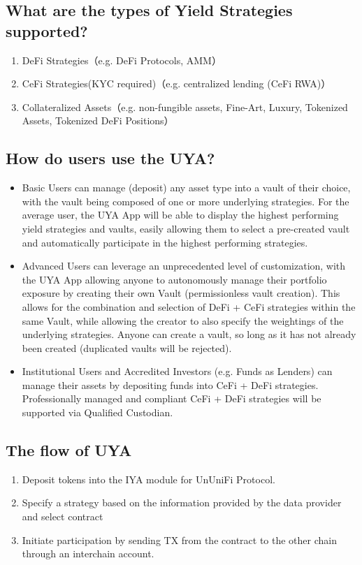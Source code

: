 \documentclass[dvipdfmx]{jsarticle}
\begin{document}
\subsection{What are the types of Yield Strategies supported?}
\begin{enumerate}
  \item DeFi Strategies（e.g. DeFi Protocols, AMM）
  \item CeFi Strategies(KYC required)（e.g. centralized lending (CeFi RWA)）
  \item Collateralized Assets（e.g. non-fungible assets, Fine-Art, Luxury, Tokenized Assets, Tokenized DeFi Positions）
\end{enumerate}

\subsection{How do users use the UYA?}
\begin{itemize}
  \item Basic Users can manage (deposit) any asset type into a vault of their choice, with the vault being composed of one or more underlying strategies. For the average user, the UYA App will be able to display the highest performing yield strategies and vaults, easily allowing them to select a pre-created vault and automatically participate in the highest performing strategies.
  \item Advanced Users can leverage an unprecedented level of customization, with the UYA App allowing anyone to autonomously manage their portfolio exposure by creating their own Vault (permissionless vault creation). This allows for the combination and selection of DeFi + CeFi strategies within the same Vault, while allowing the creator to also specify the weightings of the underlying strategies. Anyone can create a vault, so long as it has not already been created (duplicated vaults will be rejected).
  \item Institutional Users and Accredited Investors (e.g. Funds as Lenders) can manage their assets by depositing funds into CeFi + DeFi strategies. Professionally managed and compliant CeFi + DeFi strategies will be supported via Qualified Custodian.
\end{itemize}

\subsection{The ﬂow of UYA}
\begin{enumerate}
  \item Deposit tokens into the IYA module for UnUniFi Protocol.
  \item Specify a strategy based on the information provided by the data provider and select contract
  \item Initiate participation by sending TX from the contract to the other chain through an interchain account.
\end{enumerate}
\end{document}
